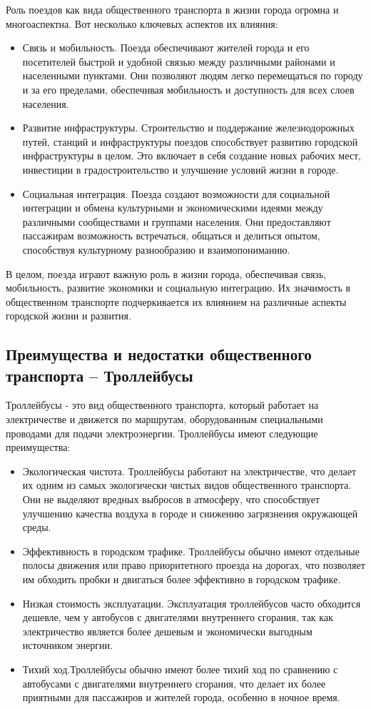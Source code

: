 Роль поездов как вида общественного транспорта в жизни города огромна и многоаспектна. Вот несколько ключевых аспектов их влияния:
\begin{itemize}
	\item Связь и мобильность. Поезда обеспечивают жителей города и его посетителей быстрой и удобной связью между различными районами и населенными пунктами. Они позволяют людям легко перемещаться по городу и за его пределами, обеспечивая мобильность и доступность для всех слоев населения.
	\item Развитие инфраструктуры. Строительство и поддержание железнодорожных путей, станций и инфраструктуры поездов способствует развитию городской инфраструктуры в целом. Это включает в себя создание новых рабочих мест, инвестиции в градостроительство и улучшение условий жизни в городе.
	\item Социальная интеграция. Поезда создают возможности для социальной интеграции и обмена культурными и экономическими идеями между различными сообществами и группами населения. Они предоставляют пассажирам возможность встречаться, общаться и делиться опытом, способствуя культурному разнообразию и взаимопониманию.
\end{itemize}

В целом, поезда играют важную роль в жизни города, обеспечивая связь, мобильность, развитие экономики и социальную интеграцию. Их значимость в общественном транспорте подчеркивается их влиянием на различные аспекты городской жизни и развития.
	
\subsection{Преимущества и недостатки общественного транспорта -- Троллейбусы}

Троллейбусы - это вид общественного транспорта, который работает на электричестве и движется по маршрутам, оборудованным специальными проводами для подачи электроэнергии. Троллейбусы имеют следующие преимущества:
\begin{itemize}
	\item Экологическая чистота. Троллейбусы работают на электричестве, что делает их одним из самых экологически чистых видов общественного транспорта. Они не выделяют вредных выбросов в атмосферу, что способствует улучшению качества воздуха в городе и снижению загрязнения окружающей среды.
	\item Эффективность в городском трафике. Троллейбусы обычно имеют отдельные полосы движения или право приоритетного проезда на дорогах, что позволяет им обходить пробки и двигаться более эффективно в городском трафике.
	\item Низкая стоимость эксплуатации. Эксплуатация троллейбусов часто обходится дешевле, чем у автобусов с двигателями внутреннего сгорания, так как электричество является более дешевым и экономически выгодным источником энергии.
	\item Тихий ход.Троллейбусы обычно имеют более тихий ход по сравнению с автобусами с двигателями внутреннего сгорания, что делает их более приятными для пассажиров и жителей города, особенно в ночное время.
\end{itemize}

